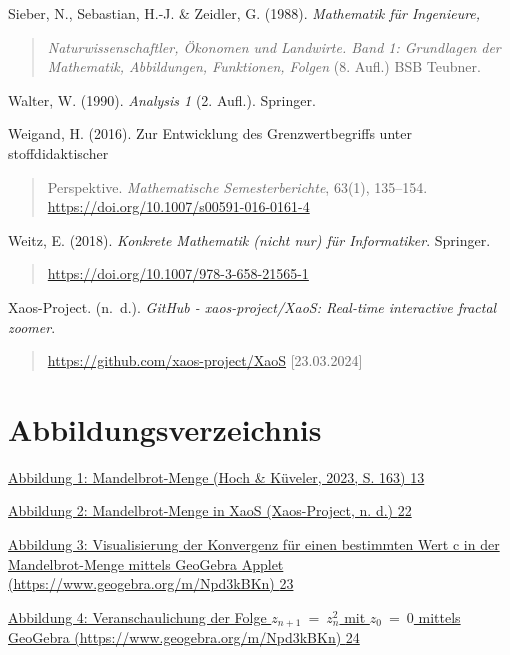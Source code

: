 \documentclass[a4paper, 12pt]{book}
\begin{document}
Sieber, N., Sebastian, H.-J. \& Zeidler, G. (1988). \emph{Mathematik für
Ingenieure,}

\begin{quote}
\emph{Naturwissenschaftler, Ökonomen und Landwirte. Band 1: Grundlagen
der Mathematik, Abbildungen, Funktionen, Folgen} (8. Aufl.) BSB Teubner.
\end{quote}

Walter, W. (1990). \emph{Analysis 1} (2. Aufl.). Springer.

Weigand, H. (2016). Zur Entwicklung des Grenzwertbegriffs unter
stoffdidaktischer

\begin{quote}
Perspektive. \emph{Mathematische Semesterberichte}, 63(1), 135--154.
\url{https://doi.org/10.1007/s00591-016-0161-4}
\end{quote}

Weitz, E. (2018). \emph{Konkrete Mathematik (nicht nur) für
Informatiker}. Springer.

\begin{quote}
\url{https://doi.org/10.1007/978-3-658-21565-1}
\end{quote}

Xaos-Project. (n.~d.). \emph{GitHub - xaos-project/XaoS: Real-time
interactive fractal zoomer}.

\begin{quote}
\url{https://github.com/xaos-project/XaoS} {[}23.03.2024{]}
\end{quote}

\hypertarget{abbildungsverzeichnis}{%
\section{Abbildungsverzeichnis}\label{abbildungsverzeichnis}}

\protect\hyperlink{_Toc167901651}{Abbildung 1: Mandelbrot-Menge (Hoch \&
Küveler, 2023, S. 163) \protect\hyperlink{_Toc167901651}{13}}

\protect\hyperlink{_Toc167901652}{Abbildung 2: Mandelbrot-Menge in XaoS
(Xaos-Project, n. d.) \protect\hyperlink{_Toc167901652}{22}}

\protect\hyperlink{_Toc167901653}{Abbildung 3: Visualisierung der
Konvergenz für einen bestimmten Wert c in der Mandelbrot-Menge mittels
GeoGebra Applet (https://www.geogebra.org/m/Npd3kBKn)
\protect\hyperlink{_Toc167901653}{23}}

\protect\hyperlink{_Toc167901654}{Abbildung 4: Veranschaulichung der
Folge \(z_{n + 1}\  = \ z_{n}^{2}\) mit \(z_{0}\  = \ 0\) mittels
GeoGebra (https://www.geogebra.org/m/Npd3kBKn)
\protect\hyperlink{_Toc167901654}{24}}
\end{document}
